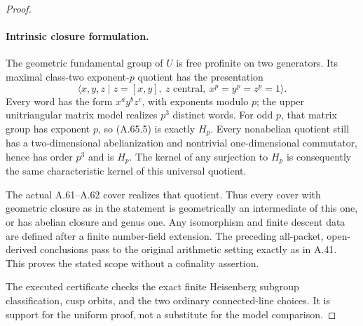 \begin{proof}
\paragraph{Intrinsic closure formulation.}
The geometric fundamental group of \(U\)
is free profinite on two generators. Its
maximal class-two exponent-\(p\) quotient
has the presentation
\[
 \langle x,y,z\mid z=[x,y],\ z\text{ central},
                      \ x^p=y^p=z^p=1\rangle.         \tag{A.65.5}
\]
Every word has the form \(x^a y^b z^c\),
with exponents modulo \(p\); the upper
unitriangular matrix model realizes
\(p^3\) distinct words. For odd \(p\),
that matrix group has exponent \(p\),
so (A.65.5) is exactly \(H_p\).
Every nonabelian quotient still has a
two-dimensional abelianization and
nontrivial one-dimensional commutator,
hence has order \(p^3\) and is \(H_p\).
The kernel of any surjection to \(H_p\)
is consequently the same characteristic
kernel of this universal quotient.

The actual A.61--A.62 cover realizes that
quotient. Thus every cover with geometric
closure as in the statement is geometrically
an intermediate of this one, or has abelian
closure and genus one. Any isomorphism and
finite descent data are defined after a
finite number-field extension. The preceding
all-packet, open-derived conclusions pass
to the original arithmetic setting exactly
as in A.41. This proves the stated scope
without a cofinality assertion.

The executed certificate
checks the exact finite Heisenberg subgroup
classification, cusp orbits, and the two
ordinary connected-line choices. It is
support for the uniform proof, not a
substitute for the model comparison.
\end{proof}
